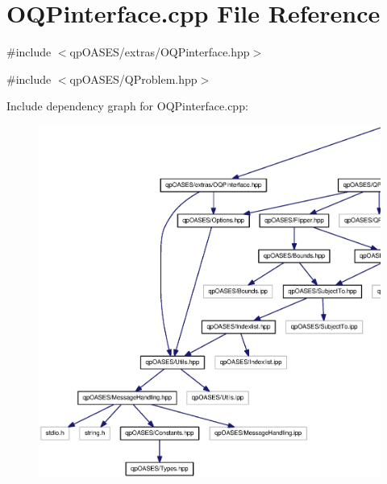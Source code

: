 \section{OQPinterface.cpp File Reference}
\label{OQPinterface_8cpp}
{\ttfamily \#include $<$qpOASES/extras/OQPinterface.hpp$>$}\par
{\ttfamily \#include $<$qpOASES/QProblem.hpp$>$}\par
Include dependency graph for OQPinterface.cpp:
\nopagebreak
\begin{figure}[H]
\begin{center}
\leavevmode
\includegraphics[width=400pt]{OQPinterface_8cpp__incl}
\end{center}
\end{figure}
